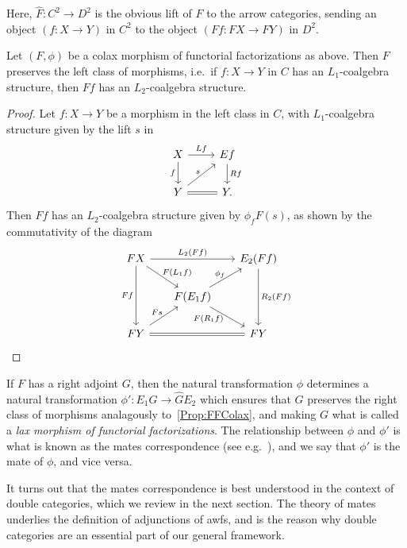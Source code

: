 Here, $\hat{F}\colon C^2\to D^2$ is the obvious lift of $F$ to the arrow categories, sending an object $(f\colon X\to Y)$ in $C^2$ to the object $(Ff\colon FX\to FY)$ in $D^2$.

\begin{proposition}\label{Prop:FFColax}
	Let $(F,\phi)$ be a colax morphism of functorial factorizations as above. Then $F$ preserves the left class of morphisms, i.e.~if $f\colon X\to Y$ in $C$ has an $L_1$-coalgebra structure, then $Ff$ has an $L_2$-coalgebra structure.
\end{proposition}
\begin{proof}
	Let $f\colon X\to Y$ be a morphism in the left class in $C$, with $L_1$-coalgebra structure given by the lift $s$ in 
	\[
	\begin{tikzcd}
		X \rar{Lf} \dar[swap]{f} & Ef \dar{Rf} \\
		Y \urar[][inner sep=1pt]{s} \rar[equal] & Y.
	\end{tikzcd}
	\]
	Then $Ff$ has an $L_2$-coalgebra structure given by $\phi_f F(s)$, as shown by the commutativity of the diagram
	\[
	\begin{tikzcd}[column sep=4ex,row sep=4ex]
		FX \ar{rr}{L_2(Ff)} \ar{dd}[swap]{Ff} \ar{dr}[inner sep=0pt]{F(L_1f)}
			&& E_2(Ff) \ar{dd}{R_2(Ff)} \\
		& F(E_1f) \ar{ur}[inner sep=0pt]{\phi_f} \ar{dr}[inner sep=0pt,swap,pos=.4]{F(R_1f)} & \\
		FY \ar{ur}[inner sep=1pt]{Fs} \ar[equal]{rr}
			&& FY
	\end{tikzcd}
	\]
\end{proof}

If $F$ has a right adjoint $G$, then the natural transformation $\phi$ determines a natural transformation $\phi'\colon E_1\hat{G}\to\hat{G}E_2$ which ensures that $G$ preserves the right class of morphisms analagously to~\cref{Prop:FFColax}, and making $G$ what is called a \emph{lax morphism of functorial factorizations}. The relationship between $\phi$ and $\phi'$ is what is known as the mates correspondence (see e.g.~\cite{cgr:mates}), and we say that $\phi'$ is the mate of $\phi$, and vice versa.

It turns out that the mates correspondence is best understood in the context of double categories, which we review in the next section. The theory of mates underlies the definition of adjunctions of awfs, and is the reason why double categories are an essential part of our general framework.